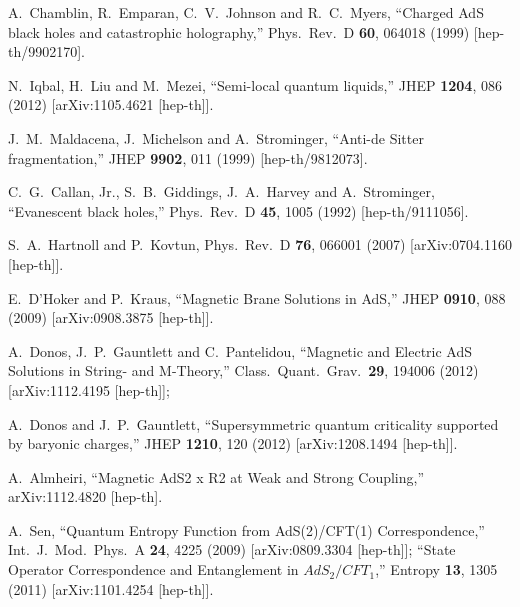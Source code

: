 \documentclass[12pt]{article}
\begin{document}
{\begin{thebibliography}{99}
  A.~Chamblin, R.~Emparan, C.~V.~Johnson and R.~C.~Myers,
  ``Charged AdS black holes and catastrophic holography,''
  Phys.\ Rev.\ D {\bf 60}, 064018 (1999)
  [hep-th/9902170].
  
  N.~Iqbal, H.~Liu and M.~Mezei,
  ``Semi-local quantum liquids,''
  JHEP {\bf 1204}, 086 (2012)
  [arXiv:1105.4621 [hep-th]].
  
  J.~M.~Maldacena, J.~Michelson and A.~Strominger,
  ``Anti-de Sitter fragmentation,''
  JHEP {\bf 9902}, 011 (1999)
  [hep-th/9812073].
  
  C.~G.~Callan, Jr., S.~B.~Giddings, J.~A.~Harvey and A.~Strominger,
  ``Evanescent black holes,''
  Phys.\ Rev.\ D {\bf 45}, 1005 (1992)
  [hep-th/9111056].
  
  S.~A.~Hartnoll and P.~Kovtun,
  Phys.\ Rev.\ D {\bf 76}, 066001 (2007)
  [arXiv:0704.1160 [hep-th]].
  
  E.~D'Hoker and P.~Kraus,
  ``Magnetic Brane Solutions in AdS,''
  JHEP {\bf 0910}, 088 (2009)
  [arXiv:0908.3875 [hep-th]].
  
  A.~Donos, J.~P.~Gauntlett and C.~Pantelidou,
  ``Magnetic and Electric AdS Solutions in String- and M-Theory,''
  Class.\ Quant.\ Grav.\  {\bf 29}, 194006 (2012)
  [arXiv:1112.4195 [hep-th]];
  
  A.~Donos and J.~P.~Gauntlett,
  ``Supersymmetric quantum criticality supported by baryonic charges,''
  JHEP {\bf 1210}, 120 (2012)
  [arXiv:1208.1494 [hep-th]].
    
  A.~Almheiri,
  ``Magnetic AdS2 x R2 at Weak and Strong Coupling,''
  arXiv:1112.4820 [hep-th].
  
  A.~Sen,
  ``Quantum Entropy Function from AdS(2)/CFT(1) Correspondence,''
  Int.\ J.\ Mod.\ Phys.\ A {\bf 24}, 4225 (2009)
  [arXiv:0809.3304 [hep-th]];
  ``State Operator Correspondence and Entanglement in $AdS_2/CFT_1$,''
  Entropy {\bf 13}, 1305 (2011)
  [arXiv:1101.4254 [hep-th]].
  

\end{thebibliography}}
\end{document}
